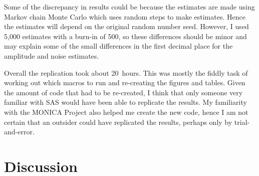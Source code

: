 Some of the discrepancy in results could be because the estimates are made using Markov chain Monte Carlo which uses random steps to make estimates. Hence the estimates will depend on the original random number seed. However, I used 5,000 estimates with a burn-in of 500, so these differences should be minor and may explain some of the small differences in the first decimal place for the amplitude and noise estimates.


Overall the replication took about 20~hours. This was mostly the fiddly task of working out which macros to run and re-creating the figures and tables. Given the amount of code that had to be re-created, I think that only someone very familiar with SAS would have been able to replicate the results. My familiarity with the MONICA Project also helped me create the new code, hence I am not certain that an outsider could have replicated the results, perhaps only by trial-and-error.



\section{Discussion}


